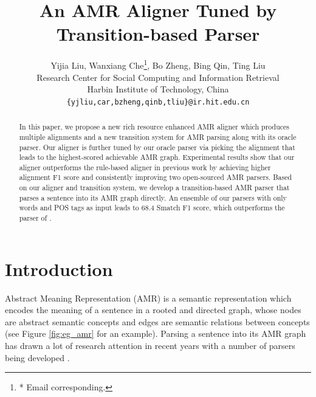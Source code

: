 \documentclass[11pt,a4paper]{article}
\title{An AMR Aligner Tuned by Transition-based Parser}
\author{Yijia Liu, Wanxiang Che\thanks{* Email corresponding.}, Bo Zheng, Bing Qin, Ting Liu \\
	Research Center for Social Computing and Information Retrieval \\
	Harbin Institute of Technology, China \\
	{\tt \{yjliu,car,bzheng,qinb,tliu\}@ir.hit.edu.cn}	
}
\date{}
\begin{document}
\maketitle
\begin{abstract}
In this paper, we propose a new rich resource
enhanced AMR aligner which produces multiple
alignments and a new transition system for AMR parsing
along with its oracle parser.
Our aligner is further tuned by
our oracle parser via picking the alignment that
leads to the highest-scored achievable AMR graph.
Experimental results show that our aligner outperforms the rule-based aligner in previous work
by achieving higher alignment F1 score and consistently improving two open-sourced AMR parsers.
Based on our aligner and transition system, 
we develop a transition-based AMR parser that parses a sentence into its AMR graph directly.
An ensemble of our parsers with only words and POS tags as input
leads to 68.4 Smatch F1 score,
which outperforms the parser of \citet{wang-xue:2017:EMNLP2017}.
\end{abstract}

\section{Introduction}\label{sec:intro}

Abstract Meaning Representation (AMR) \cite{banarescu-EtAl:2013:LAW7-ID}
is a semantic representation which encodes the meaning of a sentence
in a rooted and directed graph, 
whose nodes are abstract semantic concepts and edges are semantic relations between concepts
(see Figure \ref{fig:eg_amr} for an example).
Parsing a sentence into its AMR graph has
drawn a lot of research attention in recent years
with a number of parsers being developed
\cite{flanigan-EtAl:2014:P14-1,
	wang-xue-pradhan:2015:NAACL-HLT,
	pust-EtAl:2015:EMNLP,
	artzi-lee-zettlemoyer:2015:EMNLP,
	peng-song-gildea:2015:CoNLL,
	zhou-EtAl:2016:EMNLP20163,
	goodman-vlachos-naradowsky:2016:P16-1,
	damonte-cohen-satta:2017:EACLlong,
	ballesteros-alonaizan:2017:EMNLP2017,
	foland-martin:2017:Long,
	konstas-EtAl:2017:Long}.
\end{document}

